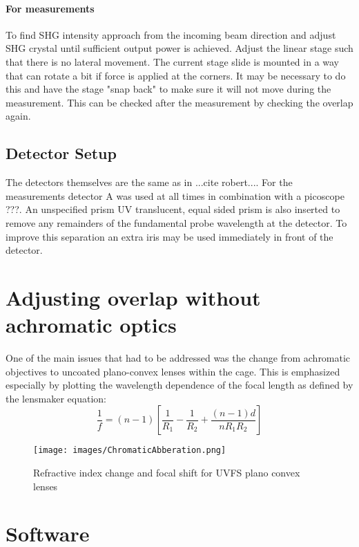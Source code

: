 \documentclass[10pt,a4paper]{article}
\begin{document}
\paragraph{For measurements}
To find SHG intensity approach from the incoming beam direction and adjust SHG crystal until sufficient output power is achieved.\newline
Adjust the linear stage such that there is no lateral movement. The current stage slide is mounted in a way that can rotate a bit if force is applied at the corners. It may be necessary to do this and have the stage "snap back" to make sure it will not move during the measurement. This can be checked after the measurement by checking the overlap again.
\subsection{Detector Setup}
The detectors themselves are the same as in ...cite robert.... For the measurements detector A was used at all times in combination with a picoscope ???. An unspecified prism UV translucent, equal sided prism is also inserted to remove any remainders of the fundamental probe wavelength at the detector. To improve this separation an extra iris may be used immediately in front of the detector.
\section{Adjusting overlap without achromatic optics}
One of the main issues that had to be addressed was the change from achromatic objectives to uncoated plano-convex lenses within the cage.\newline
This is emphasized especially by plotting the wavelength dependence of the focal length as defined by the lensmaker equation:
\begin{equation}
\frac{1}{f} = (n-1) \left[\frac{1}{R_1} - \frac{1}{R_2} + \frac{(n-1)d}{n R_1 R_2}\right]
\end{equation}
\begin{figure}[h]
\centering
\texttt{[image: images/ChromaticAbberation.png]}
\caption{Refractive index change and focal shift for UVFS plano convex lenses}
\end{figure}

\section{Software}
\end{document}
